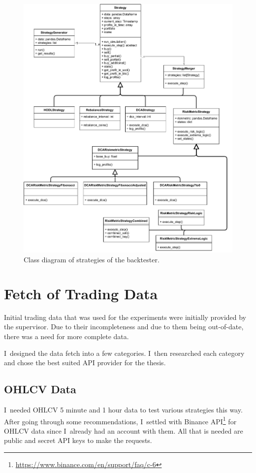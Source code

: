 \begin{figure}[!hbt]
    \centering
    \includegraphics[width=\columnwidth]{figures/strategy-class-diagram.pdf}
    \caption{Class diagram of strategies of the backtester.}
    \label{figure-strategy-class-diagram}
\end{figure}


\section{Fetch of Trading Data}
Initial trading data that was used for the experiments were initially provided by the supervisor. Due to their incompleteness and due to them being out-of-date, there was a need for more complete data.

I~designed the data fetch into a few categories. I~then researched each category and chose the best suited API provider for the thesis.

\subsection*{OHLCV Data}
I~needed OHLCV 5 minute and 1 hour data to test various strategies this way. After going through some recommendations, I~settled with Binance API\footnote{\url{https://www.binance.com/en/support/faq/c-6}} for OHLCV data since I~already had an account with them. All that is needed are public and secret API keys to make the requests.

